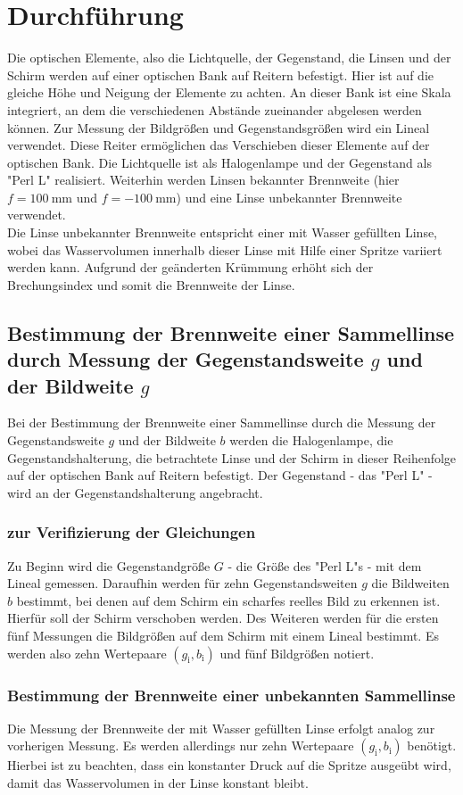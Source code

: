\section{Durchführung}
\label{sec:Durchführung}
Die optischen Elemente, also die Lichtquelle, der Gegenstand, die Linsen 
und der Schirm werden auf einer optischen Bank auf Reitern befestigt.
Hier ist auf die gleiche Höhe und Neigung der Elemente zu achten.
An dieser Bank ist eine Skala integriert,
an dem die verschiedenen Abstände zueinander abgelesen werden können.
Zur Messung der Bildgrößen und Gegenstandsgrößen wird ein Lineal verwendet.
Diese Reiter ermöglichen das Verschieben dieser Elemente auf der optischen Bank.
Die Lichtquelle ist als Halogenlampe und der Gegenstand als "Perl L" realisiert.
Weiterhin werden Linsen bekannter Brennweite (hier $f=\SI{100}{\milli\meter}$ und
$f=-\SI{100}{\milli\meter}$) und eine Linse unbekannter Brennweite verwendet. \\
Die Linse unbekannter Brennweite entspricht einer mit Wasser gefüllten Linse, wobei das Wasservolumen
innerhalb dieser Linse mit Hilfe einer Spritze variiert werden kann. Aufgrund der
geänderten Krümmung erhöht sich der Brechungsindex und somit die Brennweite der Linse.
\subsection{Bestimmung der Brennweite einer Sammellinse durch Messung der Gegenstandsweite $g$ und der Bildweite $g$}
Bei der Bestimmung der Brennweite einer Sammellinse durch die Messung der Gegenstandsweite $g$ und
der Bildweite $b$ werden die Halogenlampe, die Gegenstandshalterung, die betrachtete
Linse und der Schirm
in dieser Reihenfolge auf der optischen Bank auf Reitern befestigt.
Der Gegenstand - das "Perl L" - wird an der Gegenstandshalterung angebracht.
\subsubsection{zur Verifizierung der Gleichungen}
Zu Beginn wird die Gegenstandgröße $G$ - die Größe des "Perl L"s - mit dem Lineal gemessen.
Daraufhin werden für zehn Gegenstandsweiten $g$ die Bildweiten $b$ bestimmt, bei denen auf dem
Schirm ein scharfes reelles Bild zu erkennen ist. Hierfür soll der Schirm verschoben werden.
Des Weiteren werden für die ersten fünf Messungen die Bildgrößen auf dem Schirm mit
einem Lineal bestimmt. Es werden also zehn Wertepaare $(g_{\mathrm{i}},b_{\mathrm{i}})$ und
fünf Bildgrößen notiert.
\subsubsection{Bestimmung der Brennweite einer unbekannten Sammellinse}
Die Messung der Brennweite der mit Wasser gefüllten Linse erfolgt analog zur vorherigen
Messung. Es werden allerdings nur zehn Wertepaare $(g_{\mathrm{i}},b_{\mathrm{i}})$
benötigt.\\
Hierbei ist zu beachten, dass ein konstanter Druck auf die Spritze ausgeübt wird,
damit das Wasservolumen in der Linse konstant bleibt.

